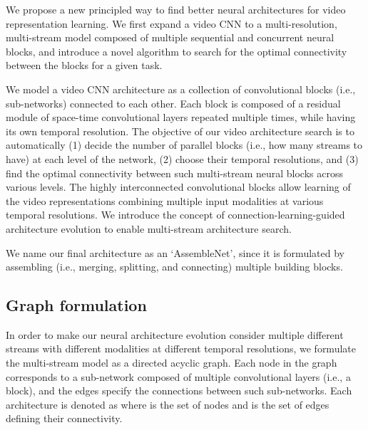 \documentclass{article} \usepackage{iclr2020_conference,times}
\begin{document}
We propose a new principled way to find better neural architectures for video representation learning. We first expand a video CNN to a multi-resolution, multi-stream model composed of multiple sequential and concurrent neural blocks, and introduce a novel algorithm to search for the optimal connectivity between the blocks for a given task.




We model a video CNN architecture as a collection of convolutional blocks (i.e., sub-networks) connected to each other.
Each block is composed of a residual module of space-time convolutional layers repeated multiple times, while having its own temporal resolution. 
The objective of our video architecture search is to automatically (1) decide the number of parallel blocks (i.e., how many streams to have) at each level of the network, (2) choose their temporal resolutions, and (3) find the optimal connectivity between such multi-stream neural blocks across various levels. 
The highly interconnected convolutional blocks allow learning of the video representations combining multiple input modalities at various temporal resolutions. We introduce the concept of connection-learning-guided architecture evolution to enable multi-stream architecture search.



















We name our final architecture as an `AssembleNet', since it is formulated by assembling (i.e., merging, splitting, and connecting) multiple building blocks. 







\subsection{Graph formulation}

In order to make our neural architecture evolution consider multiple different streams with different modalities at different temporal resolutions, we formulate the multi-stream model as a directed acyclic graph. Each node in the graph corresponds to a sub-network composed of multiple convolutional layers (i.e., a block), and the edges specify the connections between such sub-networks. Each architecture is denoted as  where  is the set of nodes and  is the set of edges defining their connectivity.
\end{document}
